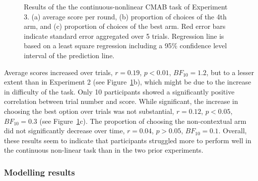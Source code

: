\documentclass[a4paper,natbib]{apa6}
\begin{document}
\begin{figure}[ht]
\begin{subfigure}{.33\textwidth}
\caption{}
\end{subfigure}
\caption{Results of the the continuous-nonlinear CMAB task of Experiment 3. (a) average score per round, (b) proportion of choices of the 4th arm, and (c) proportion of choices of the best arm. Red error bars indicate standard error aggregated over 5 trials. Regression line is based on a least square regression including a 95\% confidence level interval of the prediction line.}
\label{fig:gp}
\end{figure}

Average scores increased over trials, $r=0.19$, $p<0.01$, $BF_{10}=1.2$, but to a lesser extent than in Experiment 2 (see Figure~\ref{fig:gp}b), which might be due to the increase in difficulty of the task. Only 10 participants showed a significantly positive correlation between trial number and score. While significant, the increase in choosing the best option over trials was not substantial, $r=0.12$, $p<0.05$, $BF_{10}=0.3$ (see Figure~\ref{fig:gp}c). The proportion of choosing the non-contextual arm did not significantly decrease over time, $r=0.04$, $p>0.05$, $BF_{10}=0.1$. Overall, these results seem to indicate that participants struggled more to perform well in the continuous non-linear task than in the two prior experiments.

\subsubsection{Modelling results}
\end{document}
